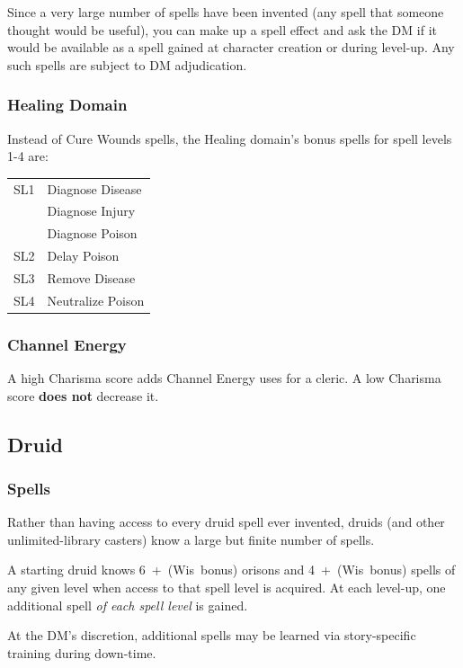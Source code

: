 Since a very large number of spells have been invented (any spell that
someone thought would be useful), you can make up a spell effect and ask
the DM if it would be available as a spell gained at character creation or
during level-up. Any such spells are subject to DM adjudication.

\subsubsection{Healing Domain}

Instead of Cure Wounds spells, the Healing domain's bonus spells for
spell levels 1-4 are:

\begin{tabular}{|l|l|}\hline
SL1 & Diagnose Disease \\
 & Diagnose Injury \\
 & Diagnose Poison \\
SL2 & Delay Poison \\
SL3 & Remove Disease \\
SL4 & Neutralize Poison \\ \hline
\end{tabular}

\subsubsection{Channel Energy}

A high Charisma score adds Channel Energy uses for a cleric. A low Charisma
score \textbf{does not} decrease it.
%

%
\subsection{Druid}

\subsubsection{Spells}

Rather than having access to every druid spell ever invented, druids
(and other unlimited-library casters) know a large but finite number of
spells.

A starting druid knows 6~+~(Wis~bonus) orisons and 4~+~(Wis~bonus)
spells of any given level when access to that spell level is acquired.
At each level-up, one additional spell \textit{of each spell level} is
gained.

At the DM's discretion, additional spells may be learned via story-specific
training during down-time.

